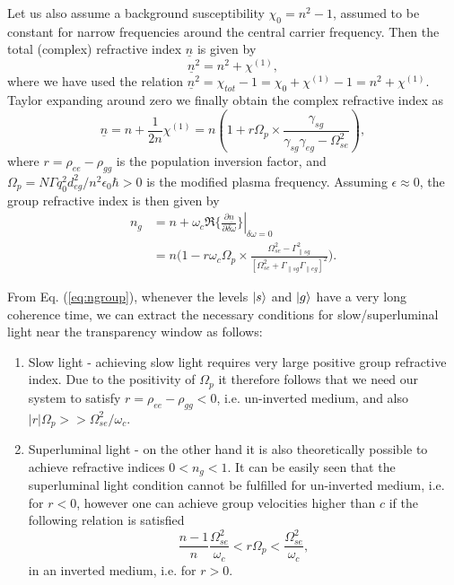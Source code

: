 \documentclass[]{spie}  %
\def\p{\partial}
\begin{document}
 Let us also assume a background susceptibility $\chi_0 = n^2-1$, assumed to be constant for narrow frequencies around the central carrier frequency. Then the total (complex) refractive index $\underline{n}$ is given by
 \begin{equation}
 \underline{n}^2 = n^2+\chi^{(1)},   
 \end{equation}
 where we have used the relation $ \underline{n}^2 = \chi_{tot} -1 = \chi_{0} + \chi^{(1)} - 1 = n^2 + \chi^{(1)}$. Taylor expanding around zero we finally obtain the complex refractive index as
 \begin{equation}
 \underline{n} = n+\frac{1}{2n}\chi^{(1)}= n(1+r\Omega_p\times \frac{\gamma_{sg}}{\gamma_{sg}\gamma_{eg} -\Omega_{se}^2  }),
 \end{equation}
 where $r = \rho_{ee} - \rho_{gg}$ is the population inversion factor, and $\Omega_p = N\Gamma q_0^2d_{eg}^2/n^2\epsilon_0\hbar > 0$ is the modified plasma frequency. Assuming $\epsilon \approx 0$, the group refractive index is then given by 
 \begin{align}
 \label{eq:ngroup}
 n_g &= n +\omega_c  \left .\Re\{\frac{\p \underline{n}}{\p \delta\omega} \}\right |_{\delta \omega = 0} \nonumber \\
 &= n\Big (1-r\omega_c\Omega_p \times \frac{\Omega_{se}^2 -\Gamma_{\parallel sg}^2} {[\Omega_{se}^2 +\Gamma_{\parallel sg}\Gamma_{\parallel eg}]^2}  \Big).
 \end{align}
 
 From Eq. (\ref{eq:ngroup}), whenever the levels $\ket{s}$ and $\ket{g}$ have a very long coherence time, we can extract the necessary conditions for slow/superluminal light near the transparency window as follows:
 \begin{enumerate}
 	\item Slow light - achieving slow light requires very large positive group refractive index. Due to the positivity of $\Omega_p$ it therefore follows that we need our system to satisfy $r=\rho_{ee}-\rho_{gg} <0 $, i.e. un-inverted medium, and also $ |r| \Omega_p >> \Omega_{se}^2/\omega_c$. 
 	\item Superluminal light - on the other hand it is also theoretically possible to achieve refractive indices $0<n_g<1$. It can be easily seen that the superluminal light condition cannot be fulfilled for un-inverted medium, i.e. 
 	for $r < 0$, however one can achieve group velocities higher than $c$ if the following relation is satisfied
 	\begin{equation}
 	\label{eq:superluminal}
 	\frac{n-1}{n}\frac{\Omega_{se}^2}{\omega_c} < r\Omega_p < \frac{\Omega_{se}^2}{\omega_c}, 
 	\end{equation}   
 	in an inverted medium, i.e. for $r > 0$.
 \end{enumerate}
 
\end{document}
